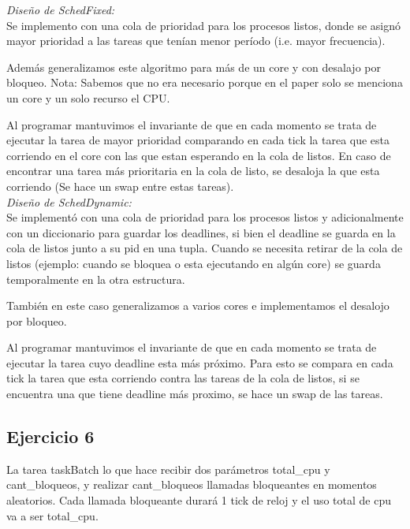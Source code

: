 \noindent
\emph{Diseño de SchedFixed:} \\

Se implemento con una cola de prioridad para los procesos listos, donde se asign\'o mayor prioridad a las tareas que tenían menor per\'iodo (i.e. mayor frecuencia). 

Además generalizamos este algoritmo para más de un core y con desalajo por bloqueo.
Nota: Sabemos que no era necesario porque en el paper solo se menciona un core y un solo recurso el CPU.

Al programar mantuvimos el invariante de que en cada momento se trata de ejecutar la tarea de mayor prioridad comparando en cada tick la tarea que esta corriendo en el core con las que estan esperando en la cola de listos. En caso de encontrar una tarea más prioritaria en la cola de listo, se desaloja la que esta corriendo (Se hace un swap entre estas tareas).\\


\noindent
\emph{Diseño de SchedDynamic:} \\

Se implement\'o con una cola de prioridad para los procesos listos y adicionalmente con un diccionario para guardar los deadlines, si bien el deadline se guarda en la cola de listos junto a su pid en una tupla. Cuando se necesita retirar de la cola de listos (ejemplo: cuando se bloquea o esta ejecutando en algún core) se guarda temporalmente en la otra estructura.

También en este caso generalizamos a varios cores e implementamos el desalojo por bloqueo.

Al programar mantuvimos el invariante de que en cada momento se trata de ejecutar la tarea cuyo deadline esta más próximo. Para esto se compara en cada tick la tarea que esta corriendo contra las tareas de la cola de listos, si se encuentra una que tiene deadline más proximo, se hace un swap de las tareas.\\


\subsection{Ejercicio 6}

La tarea taskBatch lo que hace recibir dos parámetros total\_cpu y cant\_bloqueos, y realizar
cant\_bloqueos llamadas bloqueantes en momentos aleatorios. Cada llamada bloqueante durará 1
tick de reloj y el uso total de cpu va a ser total\_cpu. \\

